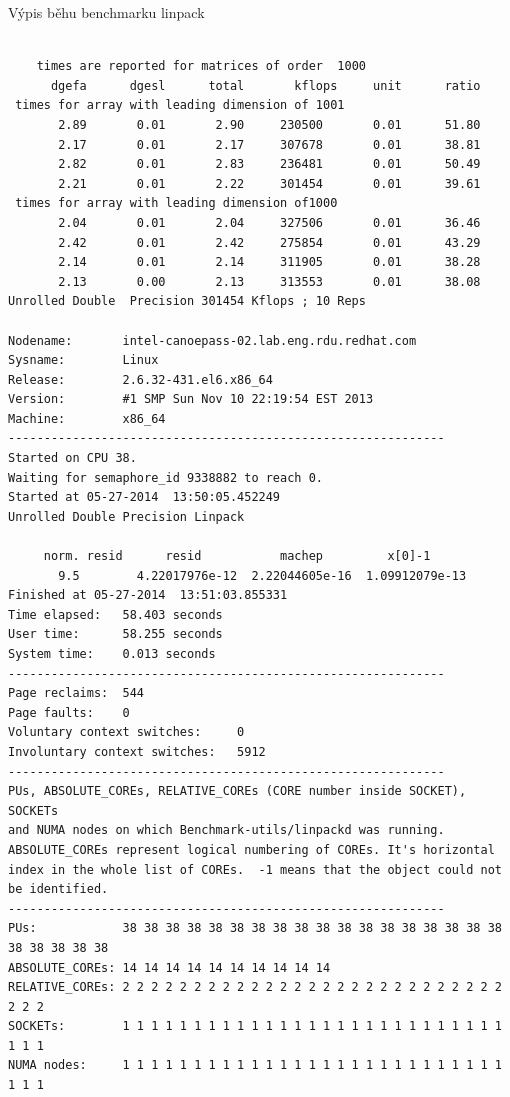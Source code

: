 \documentclass[a4paper,12pt]{article}
\begin{document}
Výpis běhu benchmarku linpack
\begingroup
\fontsize{10pt}{12pt}\selectfont
\begin{verbatim}

    times are reported for matrices of order  1000
      dgefa      dgesl      total       kflops     unit      ratio
 times for array with leading dimension of 1001
       2.89       0.01       2.90     230500       0.01      51.80
       2.17       0.01       2.17     307678       0.01      38.81
       2.82       0.01       2.83     236481       0.01      50.49
       2.21       0.01       2.22     301454       0.01      39.61
 times for array with leading dimension of1000
       2.04       0.01       2.04     327506       0.01      36.46
       2.42       0.01       2.42     275854       0.01      43.29
       2.14       0.01       2.14     311905       0.01      38.28
       2.13       0.00       2.13     313553       0.01      38.08
Unrolled Double  Precision 301454 Kflops ; 10 Reps 

Nodename:       intel-canoepass-02.lab.eng.rdu.redhat.com
Sysname:        Linux
Release:        2.6.32-431.el6.x86_64
Version:        #1 SMP Sun Nov 10 22:19:54 EST 2013
Machine:        x86_64
-------------------------------------------------------------
Started on CPU 38.
Waiting for semaphore_id 9338882 to reach 0.
Started at 05-27-2014  13:50:05.452249
Unrolled Double Precision Linpack

     norm. resid      resid           machep         x[0]-1     
       9.5        4.22017976e-12  2.22044605e-16  1.09912079e-13
Finished at 05-27-2014  13:51:03.855331
Time elapsed:   58.403 seconds
User time:      58.255 seconds
System time:    0.013 seconds
-------------------------------------------------------------
Page reclaims:  544
Page faults:    0
Voluntary context switches:     0
Involuntary context switches:   5912
-------------------------------------------------------------
PUs, ABSOLUTE_COREs, RELATIVE_COREs (CORE number inside SOCKET), SOCKETs 
and NUMA nodes on which Benchmark-utils/linpackd was running.
ABSOLUTE_COREs represent logical numbering of COREs. It's horizontal
index in the whole list of COREs.  -1 means that the object could not be identified.
-------------------------------------------------------------
PUs:            38 38 38 38 38 38 38 38 38 38 38 38 38 38 38 38 38 38 38 38 38 38 38
ABSOLUTE_COREs: 14 14 14 14 14 14 14 14 14 14 
RELATIVE_COREs: 2 2 2 2 2 2 2 2 2 2 2 2 2 2 2 2 2 2 2 2 2 2 2 2 2 2 2 2 2 2 
SOCKETs:        1 1 1 1 1 1 1 1 1 1 1 1 1 1 1 1 1 1 1 1 1 1 1 1 1 1 1 1 1 1 
NUMA nodes:     1 1 1 1 1 1 1 1 1 1 1 1 1 1 1 1 1 1 1 1 1 1 1 1 1 1 1 1 1 1 

\end{verbatim}
\endgroup
\end{document}
